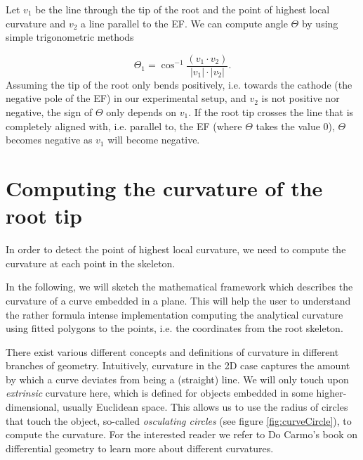 

Let \( v_{1} \) be the line through the tip of the root and the point of highest local curvature and \(v_{2} \) a line parallel to the EF. 
We can compute angle \( \Theta \)  by using simple trigonometric methods 

\begin{equation} \label{angle1}
\Theta_{1}  = \cos^{-1}\frac{( v_{1} \cdot v_{2}) }{ | v_{1} | \cdot | v_{2} |}.
\end{equation}
Assuming the tip of the root only bends positively, i.e. towards the cathode (the negative pole of the EF) in our experimental setup, and \( v_{2} \) is not positive nor negative, the sign of \(\Theta \) only depends on \( v_{1} \). If the root tip crosses the line that is completely aligned with, i.e. parallel to, the EF (where \( \Theta \) takes the value 0), \( \Theta \) becomes negative as \( v_{1} \) will become negative. 


\section{Computing the curvature of the root tip}


In order to detect the point of highest local curvature, we need to compute the curvature at each point in the skeleton. 


In the following, we will sketch the mathematical framework which describes the curvature of a curve embedded in a plane.
This will help the user to understand the rather formula intense implementation computing the analytical curvature using fitted polygons to the points, i.e. the coordinates from the root skeleton.

There exist various different concepts and definitions of curvature in different branches of geometry.
Intuitively, curvature in the 2D case captures the amount by which a curve deviates from being a (straight) line.
We will only touch upon \textit{extrinsic} curvature here, which is defined for objects embedded in some higher-dimensional, usually Euclidean space. This allows us to use the radius of circles that touch the object, so-called \textit{osculating circles} (see figure \ref{fig:curveCircle}), to compute the curvature. 
For the interested reader we refer to Do Carmo's book on differential geometry \cite{do2016differential} to learn more about different curvatures.

